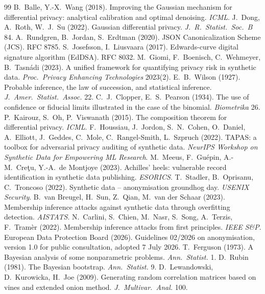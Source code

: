 \documentclass[11pt,a4paper]{article}
\theoremstyle{definition}
\theoremstyle{remark}
\begin{document}
\begin{thebibliography}{99}
 B.~Balle, Y.-X.~Wang (2018). Improving the Gaussian mechanism for differential privacy: analytical calibration and optimal denoising. \emph{ICML}.
 J.~Dong, A.~Roth, W.~J.~Su (2022). Gaussian differential privacy. \emph{J.\ R.\ Statist.\ Soc.\ B} 84.
 A.~Rundgren, B.~Jordan, S.~Erdtman (2020). JSON Canonicalization Scheme (JCS). RFC 8785.
 S.~Josefsson, I.~Liusvaara (2017). Edwards-curve digital signature algorithm (EdDSA). RFC 8032.
 M.~Giomi, F.~Boenisch, C.~Wehmeyer, B.~Tasn\'adi (2023). A unified framework for quantifying privacy risk in synthetic data. \emph{Proc.\ Privacy Enhancing Technologies} 2023(2).
 E.~B.~Wilson (1927). Probable inference, the law of succession, and statistical inference. \emph{J.\ Amer.\ Statist.\ Assoc.} 22.
 C.~J.~Clopper, E.~S.~Pearson (1934). The use of confidence or fiducial limits illustrated in the case of the binomial. \emph{Biometrika} 26.
 P.~Kairouz, S.~Oh, P.~Viswanath (2015). The composition theorem for differential privacy. \emph{ICML}.
 F.~Houssiau, J.~Jordon, S.~N.~Cohen, O.~Daniel, A.~Elliott, J.~Geddes, C.~Mole, C.~Rangel-Smith, L.~Szpruch (2022). TAPAS: a toolbox for adversarial privacy auditing of synthetic data. \emph{NeurIPS Workshop on Synthetic Data for Empowering ML Research}.
 M.~Meeus, F.~Gu\'epin, A.-M.~Cre\c{t}u, Y.-A.~de Montjoye (2023). Achilles' heels: vulnerable record identification in synthetic data publishing. \emph{ESORICS}.
 T.~Stadler, B.~Oprisanu, C.~Troncoso (2022). Synthetic data -- anonymisation groundhog day. \emph{USENIX Security}.
 B.~van Breugel, H.~Sun, Z.~Qian, M.~van der Schaar (2023). Membership inference attacks against synthetic data through overfitting detection. \emph{AISTATS}.
 N.~Carlini, S.~Chien, M.~Nasr, S.~Song, A.~Terzis, F.~Tram\`er (2022). Membership inference attacks from first principles. \emph{IEEE S\&P}.
 European Data Protection Board (2026). Guidelines 02/2026 on anonymisation, version 1.0 for public consultation, adopted 7 July 2026.
 T.~Ferguson (1973). A Bayesian analysis of some nonparametric problems. \emph{Ann.\ Statist.} 1.
 D.~Rubin (1981). The Bayesian bootstrap. \emph{Ann.\ Statist.} 9.
 D.~Lewandowski, D.~Kurowicka, H.~Joe (2009). Generating random correlation matrices based on vines and extended onion method. \emph{J.\ Multivar.\ Anal.} 100.

\end{thebibliography}
\end{document}
